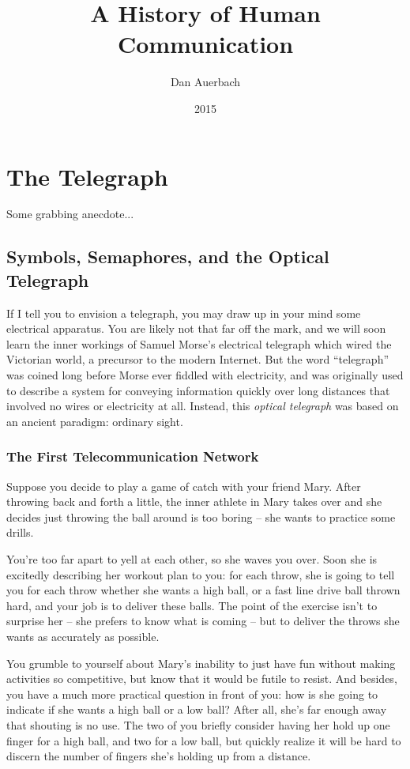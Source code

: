 \documentclass{book}
\begin{document}
\title{A History of Human Communication}
\author{Dan Auerbach}
\date{2015}
\maketitle

\part{The Telegraph}

Some grabbing anecdote...

\chapter{Symbols, Semaphores, and the Optical Telegraph}

If I tell you to envision a telegraph, you may draw up in your mind some electrical apparatus. You are likely not that far off the mark, and we will soon learn the inner workings of Samuel Morse's electrical telegraph which wired the Victorian world, a precursor to the modern Internet. But the word ``telegraph'' was coined long before Morse ever fiddled with electricity, and was originally used to describe a system for conveying information quickly over long distances that involved no wires or electricity at all. Instead, this \emph{optical telegraph} was based on an ancient paradigm: ordinary sight.

\section{The First Telecommunication Network}

Suppose you decide to play a game of catch with your friend Mary. After throwing back and forth a little, the inner athlete in Mary takes over and she decides just throwing the ball around is too boring -- she wants to practice some drills.

You're too far apart to yell at each other, so she waves you over. Soon she is excitedly describing her workout plan to you: for each throw, she is going to tell you for each throw whether she wants a high ball, or a fast line drive ball thrown hard, and your job is to deliver these balls. The point of the exercise isn't to surprise her -- she prefers to know what is coming -- but to deliver the throws she wants as accurately as possible.

You grumble to yourself about Mary's inability to just have fun without making activities so competitive, but know that it would be futile to resist. And besides, you have a much more practical question in front of you: how is she going to indicate if she wants a high ball or a low ball? After all, she's far enough away that shouting is no use. The two of you briefly consider having her hold up one finger for a high ball, and two for a low ball, but quickly realize it will be hard to discern the number of fingers she's holding up from a distance.
\end{document}
